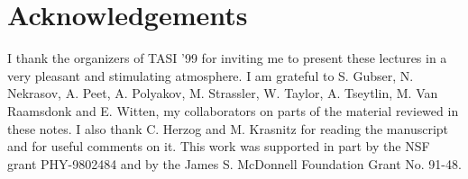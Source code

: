 \section*{Acknowledgements}
I thank the organizers of TASI '99 for inviting me to present
these lectures in a very pleasant and stimulating atmosphere.
I am grateful to S. Gubser, N. Nekrasov, A. Peet, A. Polyakov, 
M. Strassler, W. Taylor, A. Tseytlin, M. Van Raamsdonk and
E. Witten, my collaborators on parts of the material reviewed in these
notes. I also thank C. Herzog and M. Krasnitz for reading the manuscript and
for useful comments on it.
This work  was supported in part by the NSF grant PHY-9802484 
and by the James S. McDonnell Foundation Grant No. 91-48.  

 

